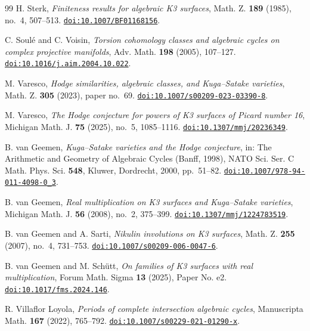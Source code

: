 \documentclass[11pt,reqno]{amsart}
\numberwithin{equation}{section}
\theoremstyle{plain}
\theoremstyle{definition}
\begin{document}
\begin{thebibliography}{99}
H. Sterk,
\emph{Finiteness results for algebraic K3 surfaces},
Math. Z. \textbf{189} (1985), no.~4, 507--513.
\href{https://doi.org/10.1007/BF01168156}{\nolinkurl{doi:10.1007/BF01168156}}.

C. Soul\'e and C. Voisin,
\emph{Torsion cohomology classes and algebraic cycles on complex projective manifolds},
Adv. Math. \textbf{198} (2005), 107--127.
\href{https://doi.org/10.1016/j.aim.2004.10.022}{\nolinkurl{doi:10.1016/j.aim.2004.10.022}}.

M. Varesco,
\emph{Hodge similarities, algebraic classes, and Kuga--Satake varieties},
Math. Z. \textbf{305} (2023), paper no.~69.
\href{https://doi.org/10.1007/s00209-023-03390-8}{\nolinkurl{doi:10.1007/s00209-023-03390-8}}.

M. Varesco,
\emph{The Hodge conjecture for powers of K3 surfaces of Picard number 16},
Michigan Math. J. \textbf{75} (2025), no.~5, 1085--1116.
\href{https://doi.org/10.1307/mmj/20236349}{\nolinkurl{doi:10.1307/mmj/20236349}}.

B. van Geemen,
\emph{Kuga--Satake varieties and the Hodge conjecture},
in: The Arithmetic and Geometry of Algebraic Cycles (Banff, 1998),
NATO Sci. Ser. C Math. Phys. Sci. \textbf{548},
Kluwer, Dordrecht, 2000, pp.~51--82.
\href{https://doi.org/10.1007/978-94-011-4098-0_3}{\nolinkurl{doi:10.1007/978-94-011-4098-0_3}}.

B. van Geemen,
\emph{Real multiplication on K3 surfaces and Kuga--Satake varieties},
Michigan Math. J. \textbf{56} (2008), no.~2, 375--399.
\href{https://doi.org/10.1307/mmj/1224783519}{\nolinkurl{doi:10.1307/mmj/1224783519}}.

B. van Geemen and A. Sarti,
\emph{Nikulin involutions on K3 surfaces},
Math. Z. \textbf{255} (2007), no.~4, 731--753.
\href{https://doi.org/10.1007/s00209-006-0047-6}{\nolinkurl{doi:10.1007/s00209-006-0047-6}}.

B. van Geemen and M. Sch\"utt,
\emph{On families of K3 surfaces with real multiplication},
Forum Math. Sigma \textbf{13} (2025), Paper No. e2.
\href{https://doi.org/10.1017/fms.2024.146}{\nolinkurl{doi:10.1017/fms.2024.146}}.

R. Villaflor Loyola,
\emph{Periods of complete intersection algebraic cycles},
Manuscripta Math. \textbf{167} (2022), 765--792.
\href{https://doi.org/10.1007/s00229-021-01290-x}{\nolinkurl{doi:10.1007/s00229-021-01290-x}}.


\end{thebibliography}
\end{document}
